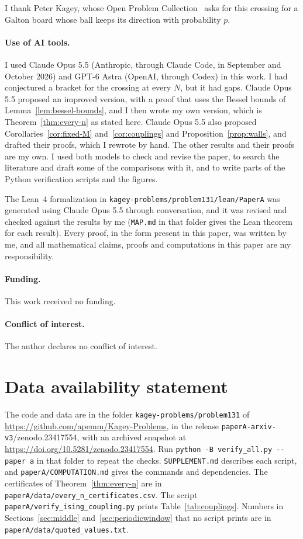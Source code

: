 \documentclass[11pt]{article}
\theoremstyle{definition}
\theoremstyle{remark}
\def\zenodoDOI{10.5281/zenodo.23417554}
\begin{document}
I thank Peter Kagey, whose Open Problem
Collection~\cite{kagey131} asks for this crossing for a Galton board whose
ball keeps its direction with probability $p$.

\paragraph{Use of AI tools.} I used Claude Opus 5.5 (Anthropic, through
Claude Code, in September and October 2026) and GPT-6 Astra (OpenAI,
through Codex) in this work. I had conjectured a bracket for the crossing at
every $N$, but it had gaps. Claude Opus 5.5 proposed an improved version, with a
proof that uses the Bessel bounds of Lemma~\ref{lem:bessel-bounds}, and I then
wrote my own version, which is Theorem~\ref{thm:every-n} as stated here. Claude
Opus 5.5 also proposed Corollaries~\ref{cor:fixed-M} and~\ref{cor:couplings}
and Proposition~\ref{prop:walls}, and drafted their proofs, which I rewrote
by hand. The other results and their proofs are my own. I used both
models to check and revise the paper, to search the literature and draft some
of the comparisons with it, and to write parts of the Python verification
scripts and the figures.

The Lean~4 formalization in \nolinkurl{kagey-problems/problem131/lean/PaperA}
was generated using Claude Opus 5.5 through conversation, and it was revised
and checked against the results by me (\nolinkurl{MAP.md} in that folder gives
the Lean theorem for each result). Every proof, in the form present in this
paper, was written by me, and all mathematical claims, proofs and computations
in this paper are my responsibility.

\paragraph{Funding.} This work received no funding.

\paragraph{Conflict of interest.} The author declares no conflict of
interest.

\section*{Data availability statement}

The code and data are in the folder \nolinkurl{kagey-problems/problem131} of
\url{https://github.com/apemm/Kagey-Problems}, in the release
\texttt{paperA-arxiv-v3}\ifx\zenodoDOI\empty\else, with an archived snapshot at
\url{https://doi.org/\zenodoDOI}\fi. Run
\texttt{python -B verify\_all.py -{}-paper a} in that folder to repeat the
checks. \nolinkurl{SUPPLEMENT.md} describes each script, and
\nolinkurl{paperA/COMPUTATION.md} gives the commands and dependencies. The
certificates of Theorem~\ref{thm:every-n} are in
\nolinkurl{paperA/data/every_n_certificates.csv}. The script
\nolinkurl{paperA/verify_ising_coupling.py} prints
Table~\ref{tab:couplings}. Numbers in Sections~\ref{sec:middle}
and~\ref{sec:periodicwindow} that no script prints are in
\nolinkurl{paperA/data/quoted_values.txt}.
\end{document}
